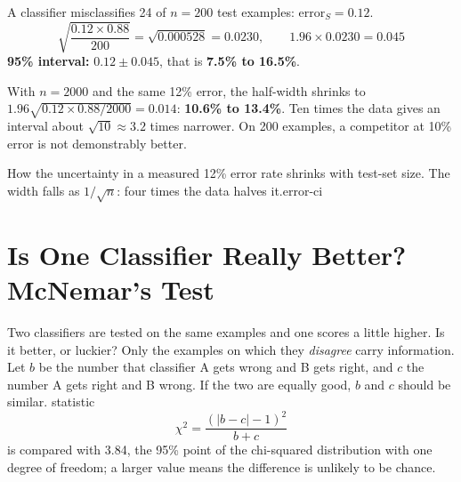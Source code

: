 \begin{worked}
A classifier misclassifies 24 of $n = 200$ test examples: $\text{error}_S = 0.12$.
\[
\sqrt{\frac{0.12 \times 0.88}{200}} = \sqrt{0.000528} = 0.0230,
\qquad 1.96 \times 0.0230 = 0.045
\]
\textbf{95\% interval:} $0.12 \pm 0.045$, that is \textbf{7.5\% to 16.5\%}.

\smallskip
With $n = 2000$ and the same 12\% error, the half-width shrinks to
$1.96\sqrt{0.12 \times 0.88/2000} = 0.014$: \textbf{10.6\% to 13.4\%}. Ten times
the data gives an interval about $\sqrt{10} \approx 3.2$ times narrower. On 200
examples, a competitor at 10\% error is not demonstrably better.
\end{worked}

%
{How the uncertainty in a measured 12\% error rate shrinks with test-set size. The width
falls as $1/\sqrt{n}$: four times the data halves it.}{error-ci}

\section{Is One Classifier Really Better? McNemar's Test}

Two classifiers are tested on the same examples and one scores a little higher.
Is it better, or luckier? Only the examples on which they \emph{disagree} carry
information. Let $b$ be the number that classifier A gets wrong and B gets
right, and $c$ the number A gets right and B wrong. If the two are equally good,
$b$ and $c$ should be similar.  statistic
\[
\chi^2 = \frac{(|b - c| - 1)^2}{b + c}
\]
is compared with 3.84, the 95\% point of the chi-squared distribution with one
degree of freedom; a larger value means the difference is unlikely to be chance.

